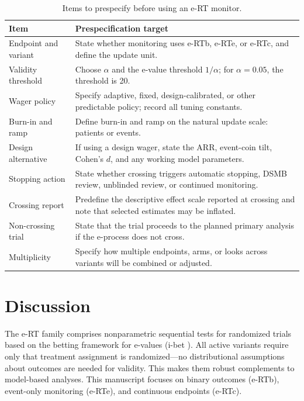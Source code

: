 \documentclass[10pt]{article}
\begin{document}
\begin{table}[htbp]
\centering
\small
\caption{Items to prespecify before using an e-RT monitor.}
\label{tab:prespec_checklist}
\begin{tabular}{p{}p{}}
\toprule
Item & Prespecification target \\
\midrule
Endpoint and variant & State whether monitoring uses e-RTb, e-RTe, or e-RTc, and define the update unit. \\
Validity threshold & Choose $\alpha$ and the e-value threshold $1/\alpha$; for $\alpha=0.05$, the threshold is 20. \\
Wager policy & Specify adaptive, fixed, design-calibrated, or other predictable policy; record all tuning constants. \\
Burn-in and ramp & Define burn-in and ramp on the natural update scale: patients or events. \\
Design alternative & If using a design wager, state the ARR, event-coin tilt, Cohen's $d$, and any working model parameters. \\
Stopping action & State whether crossing triggers automatic stopping, DSMB review, unblinded review, or continued monitoring. \\
Crossing report & Predefine the descriptive effect scale reported at crossing and note that selected estimates may be inflated. \\
Non-crossing trial & State that the trial proceeds to the planned primary analysis if the e-process does not cross. \\
Multiplicity & Specify how multiple endpoints, arms, or looks across variants will be combined or adjusted. \\
\bottomrule
\end{tabular}
\end{table}

\section{Discussion}

The e-RT family comprises nonparametric sequential tests for randomized trials based on the betting framework for e-values (i-bet \cite{pmlr-v177-duan22a}). All active variants require only that treatment assignment is randomized---no distributional assumptions about outcomes are needed for validity. This makes them robust complements to model-based analyses. This manuscript focuses on binary outcomes (e-RTb), event-only monitoring (e-RTe), and continuous endpoints (e-RTc).
\end{document}
